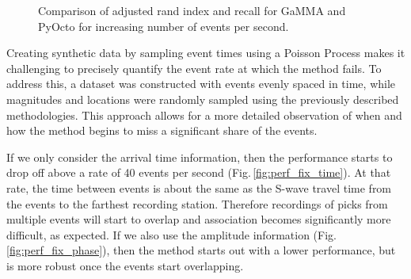 \documentclass{scrreprt}
\begin{document}
\begin{figure}[ht]
\begin{minipage}{0.42\textwidth}
    \end{minipage}
    \caption{\label{fig:performance}Comparison of adjusted rand index and recall for GaMMA and PyOcto for increasing number of events per second.}
\end{figure}

Creating synthetic data by sampling event times using a Poisson Process makes it challenging to precisely quantify the event rate at which the method fails. To address this, a dataset was constructed with events evenly spaced in time, while magnitudes and locations were randomly sampled using the previously described methodologies. This approach allows for a more detailed observation of when and how the method begins to miss a significant share of the events.

If we only consider the arrival time information, then the performance starts to drop off above a rate of 40 events per second (Fig.\,\ref{fig:perf_fix_time}). At that rate, the time between events is about the same as the S-wave travel time from the events to the farthest recording station. Therefore recordings of picks from multiple events will start to overlap and association becomes significantly more difficult, as expected. If we also use the amplitude information (Fig.\,\ref{fig:perf_fix_phase}), then the method starts out with a lower performance, but is more robust once the events start overlapping.
\end{document}
